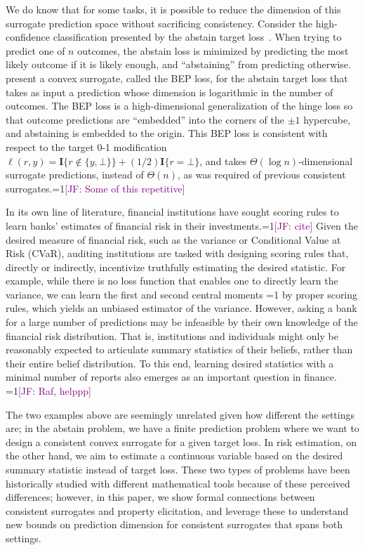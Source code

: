 \documentclass[anon,12pt]{colt2021} %
\newcommand{\Comments}{1}
\newcommand{\mynote}[2]{\ifnum\Comments=1\textcolor{#1}{#2}\fi}
\newcommand{\mytodo}[2]{\ifnum\Comments=1%
	\todo[linecolor=#1!80!black,backgroundcolor=#1,bordercolor=#1!80!black]{#2}\fi}
\newcommand{\jessie}[1]{\mynote{purple}{[JF: #1]}}
\newcommand{\jessiet}[1]{\mytodo{purple!20!white}{JF: #1}}
\newcommand{\Ind}[1]{\mathbf{I}\{{#1}\}}
\begin{document}
We do know that for some tasks, it is possible to reduce the dimension of this surrogate prediction space without sacrificing consistency.  
Consider the high-confidence classification presented by the abstain target loss~\citep{ramaswamy2012classification,ramaswamy2018consistent}.
When trying to predict one of $n$ outcomes, the abstain loss is minimized by predicting the most likely outcome if it is likely enough, and ``abstaining'' from predicting otherwise.
\citet{ramaswamy2016convex} present a convex surrogate, called the BEP loss, for the abstain target loss that takes as input a prediction whose dimension is logarithmic in the number of outcomes.
The BEP loss is a high-dimensional generalization of the hinge loss so that outcome predictions are ``embedded'' into the corners of the $\pm 1$ hypercube, and abstaining is embedded to the origin.
This BEP loss is consistent with respect to the target 0-1 modification $\ell(r,y) = \Ind{r \not \in \{y,\bot\}} + (1/2) \Ind{r = \bot}$, and takes $\Theta(\log n)$-dimensional surrogate predictions, instead of $\Theta(n)$, as was required of previous consistent surrogates.\jessie{Some of this repetitive}


In its own line of literature, financial institutions have sought scoring rules to learn banks' estimates of financial risk in their investments.\jessie{cite}
Given the desired measure of financial risk, such as the variance or Conditional Value at Risk (CVaR), auditing institutions are tasked with designing scoring rules that, directly or indirectly, incentivize truthfully estimating the desired statistic.
For example, while there is no loss function that enables one to directly learn the variance, we can learn the first and second central moments \jessiet{how much detail to share?} by proper scoring rules, which yields an unbiased estimator of the variance.
However, asking a bank for a large number of predictions may be infeasible by their own knowledge of the financial risk distribution.
That is, institutions and individuals might only be reasonably expected to articulate summary statistics of their beliefs, rather than their entire belief distribution.
To this end, learning desired statistics with a minimal number of reports also emerges as an important question in finance.
\jessie{Raf, helppp}


The two examples above are seemingly unrelated given how different the settings are; in the abstain problem, we have a finite prediction problem where we want to design a consistent convex surrogate for a given target loss.
In risk estimation, on the other hand, we aim to estimate a continuous variable based on the desired summary statistic instead of target loss.
These two types of problems have been historically studied with different mathematical tools because of these perceived differences; however, in this paper, we show formal connections between consistent surrogates and property elicitation, and leverage these to understand new bounds on prediction dimension for consistent surrogates that spans both settings. 
\end{document}
